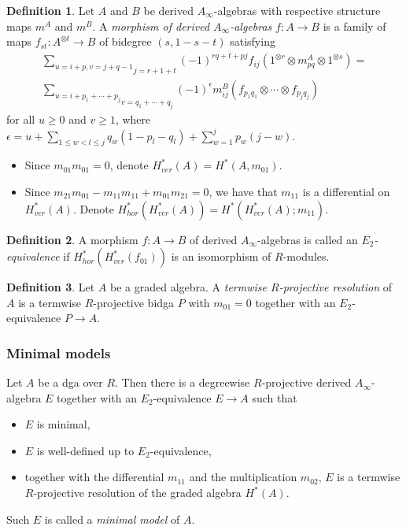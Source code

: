 \documentclass{beamer}
\theoremstyle{definition}
\newtheorem{defi}{Definition}
\begin{document}
\begin{frame}
\begin{defi}
Let $A$ and $B$ be derived $A_\infty$-algebras with respective structure maps $m^A$ and $m^B$. A \emph{morphism of derived $A_\infty$-algebras} $f:A\to B$ is a family of maps $f_{st}:A^{\otimes t}\to B$ of bidegree $(s,1-s-t)$ satisfying
\begin{align*}
\underset{j=r+1+t}{\sum_{u=i+p, v=j+q-1}}(-1)^{rq+t+pj}f_{ij}(1^{\otimes r}\otimes m_{pq}^A\otimes 1^{\otimes s})=\\
\underset{v=q_1+\cdots +q_j}{\sum_{u=i+p_1+\cdots +p_j}}(-1)^{\epsilon} m^B_{ij}(f_{p_1 q_1}\otimes\cdots\otimes f_{p_j q_j})
\end{align*}
for all $u\geq 0$ and $v\geq 1$, where
$\epsilon = u + \sum_{1\leq w < l \leq j} q_w(1-p_l-q_l)  + \sum_{w=1}^j p_w(j-w)$.
\end{defi}
\end{frame}

\begin{frame}
\begin{itemize}
\item<1-> Since $m_{01}m_{01}=0$, denote $H^*_{ver}(A)=H^*(A,m_{01})$. 
\item<2-> Since $m_{21}m_{01} - m_{11}m_{11} + m_{01}m_{21} = 0$, we have that $m_{11}$ is a differential on $H^*_{ver}(A)$. Denote $H^*_{hor}(H^*_{ver}(A)) = H^*(H^*_{ver}(A);m_{11})$.
\end{itemize}\pause

\begin{defi}
A morphism $f : A \to B$ of derived $A_\infty$-algebras
is called an \emph{$E_2$-equivalence} if $H^*_{hor}(H^*_{ver}(f_{01}))$
is an isomorphism of $R$-modules.
\end{defi}\pause
\begin{defi}
Let $A$ be a graded algebra. A \emph{termwise $R$-projective
resolution} of $A$ is a termwise $R$-projective
bidga $P$ with $m_{01} = 0$ together with an $E_2$-equivalence $P \to A$.
\end{defi}
\end{frame}

\begin{frame}
\frametitle{Minimal models}
\begin{theorem}[Sagave]
Let $A$ be a dga over $R$. Then there is a degreewise
$R$-projective derived $A_\infty$-algebra $E$ together with an $E_2$-equivalence $E \to A$ such that
\begin{itemize}
\item $E$ is minimal,
\item $E$ is well-defined up to $E_2$-equivalence,
\item together with the differential $m_{11}$ and the multiplication $m_{02}$, $E$ is a termwise $R$-projective
resolution of the graded algebra $H^*(A)$. 
\end{itemize}
\end{theorem}
Such $E$ is called a \emph{minimal model} of $A$.
\end{frame}
\end{document}
